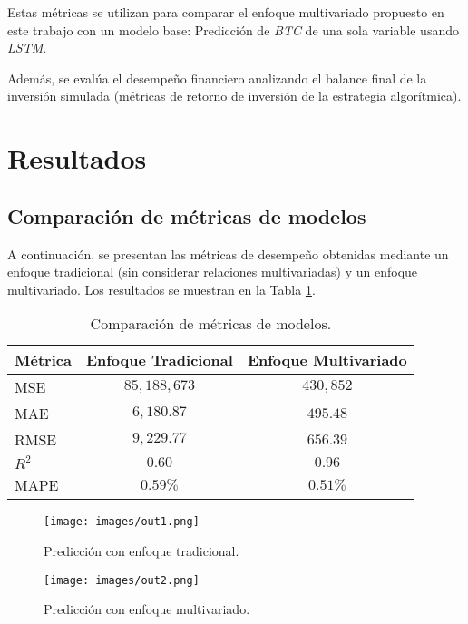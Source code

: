 \documentclass[]{article}
\begin{document}
Estas métricas se utilizan para comparar el enfoque multivariado propuesto en este trabajo con un modelo base: Predicción de \textit{BTC} de una sola variable usando \textit{LSTM}.

Además, se evalúa el desempeño financiero analizando el balance final de la inversión simulada (métricas de retorno de inversión de la estrategia algorítmica).

\section{Resultados}

\subsection{Comparación de métricas de modelos}

A continuación, se presentan las métricas de desempeño obtenidas mediante un enfoque tradicional (sin considerar relaciones multivariadas) y un enfoque multivariado. Los resultados se muestran en la Tabla \ref{tab:metrics_comparison}.

\begin{table}[H]
	\centering
	\caption{Comparación de métricas de modelos.}
	\label{tab:metrics_comparison}
	\begin{tabular}{lcc}
		\toprule
		\textbf{Métrica} & \textbf{Enfoque Tradicional} & \textbf{Enfoque Multivariado} \\
		\midrule
		MSE & $85,188,673$ & $430,852$ \\
		MAE & $6,180.87$ & $495.48$ \\
		RMSE & $9,229.77$ & $656.39$ \\
		$R^2$ & $0.60$ & $0.96$ \\
		MAPE & $0.59\%$ & $0.51\%$ \\
		\bottomrule
	\end{tabular}
\end{table}

\begin{figure}[H]
	\centering
	\texttt{[image: images/out1.png]}
	\caption{Predicción con enfoque tradicional.}
	\label{fig:performance_normal}
\end{figure}

\begin{figure}[H]
	\centering
	\texttt{[image: images/out2.png]}
	\caption{Predicción con enfoque multivariado.}
	\label{fig:performance_multivariate}
\end{figure}
\end{document}
